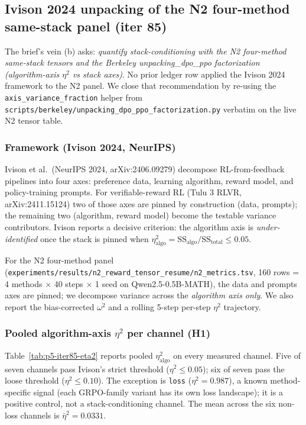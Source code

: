 \subsection{Ivison 2024 unpacking of the N2 four-method same-stack panel (iter 85)}
\label{sec:p5-iter85-ivison-unpacking}

The brief's vein (b) asks: \emph{quantify stack-conditioning with the N2
four-method same-stack tensors and the Berkeley unpacking\_dpo\_ppo
factorization (algorithm-axis $\eta^2$ vs stack axes)}. No prior ledger
row applied the Ivison 2024 framework to the N2 panel. We close that
recommendation by re-using the \texttt{axis\_variance\_fraction} helper
from \texttt{scripts/berkeley/unpacking\_dpo\_ppo\_factorization.py}
verbatim on the live N2 tensor table.

\subsubsection{Framework (Ivison 2024, NeurIPS)}
\label{sec:p5-iter85-ivison-framework}
Ivison et al.~(NeurIPS 2024, arXiv:2406.09279) decompose RL-from-feedback
pipelines into four axes: preference data, learning algorithm, reward
model, and policy-training prompts. For verifiable-reward RL (Tulu 3 RLVR,
arXiv:2411.15124) two of those axes are pinned by construction (data,
prompts); the remaining two (algorithm, reward model) become the
testable variance contributors. Ivison reports a decisive criterion:
the algorithm axis is \emph{under-identified} once the stack is pinned
when $\eta^2_{\mathrm{algo}} = \mathrm{SS}_{\mathrm{algo}}/\mathrm{SS}_{\mathrm{total}}
\le 0.05$.

For the N2 four-method panel (\texttt{experiments/results/n2\_reward\_tensor\_resume/n2\_metrics.tsv},
160 rows = 4 methods $\times$ 40 steps $\times$ 1 seed on
Qwen2.5-0.5B-MATH), the data and prompts axes are pinned; we decompose
variance across the \emph{algorithm axis only}. We also report the
bias-corrected $\omega^2$ and a rolling 5-step per-step $\eta^2$ trajectory.

\subsubsection{Pooled algorithm-axis \texorpdfstring{$\eta^2$}{eta\textasciicircum 2} per channel (H1)}
\label{sec:p5-iter85-pooled}
Table~\ref{tab:p5-iter85-eta2} reports pooled $\eta^2_{\mathrm{algo}}$
on every measured channel. Five of seven channels pass Ivison's strict
threshold ($\eta^2 \le 0.05$); six of seven pass the loose threshold
($\eta^2 \le 0.10$). The exception is \texttt{loss} ($\eta^2 = 0.987$),
a known method-specific signal (each GRPO-family variant has its own loss
landscape); it is a positive control, not a stack-conditioning channel.
The mean across the six non-loss channels is $\bar\eta^2 = 0.0331$.

